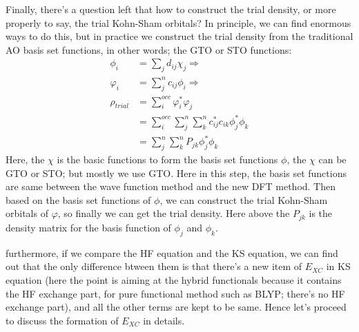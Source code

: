 Finally, there's a question left that how to construct the trial
density, or more properly to say, the trial Kohn-Sham orbitals? In
principle, we can find enormous ways to do this, but in practice we
construct the trial density from the traditional AO basis set
functions, in other words;  the GTO or STO functions:
\begin{align}
  \label{eq:XC_functional.2}
\phi_{i} &= \sum_{j}d_{ij}\chi_{j} \Rightarrow \nonumber \\
\varphi_{i} &= \sum_{j}^{n}c_{ij}\phi_{i} \Rightarrow \nonumber \\
\rho_{trial} &= \sum_{i}^{occ}\varphi_{i}^{*}\varphi_{j} \nonumber \\
&=
\sum_{i}^{occ}\sum_{j}^{n}\sum_{k}^{n}c_{ij}^{*}c_{ik}\phi_{j}^{*}\phi_{k}
\nonumber \\
&= \sum_{j}^{n}\sum_{k}^{n}P_{jk}\phi_{j}^{*}\phi_{k}
\end{align}
Here, the $\chi$ is the basic functions to form the basis set functions
$\phi$, the $\chi$ can be GTO or STO; but mostly we use GTO. Here in
this step, the basis set functions are same between the wave function
method and the new DFT method. Then based on the basis set functions
of $\phi$, we can construct the trial Kohn-Sham orbitals of $\varphi$,
so finally we can get the trial density. Here above the $P_{jk}$ is
the density matrix for the basis function of $\phi_{j}$ and
$\phi_{k}$. 

furthermore, if we compare the HF equation and the KS equation, we can
find out that the only difference btween them is that there's a new
item of $E_{XC}$ in KS equation (here the point is aiming at the
hybrid functionals because it contains the HF exchange part, for pure
functional method such as BLYP; there's no HF exchange part), and all
the other terms are kept to be same. Hence let's proceed to discuss
the formation of $E_{XC}$ in details.


